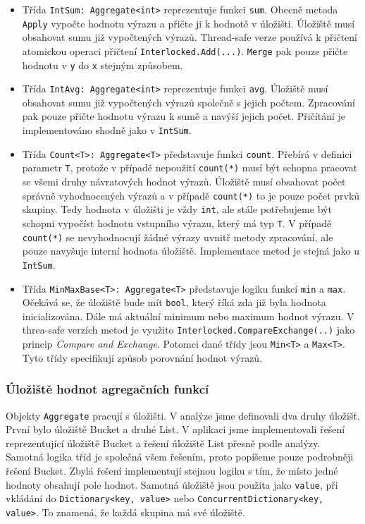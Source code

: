 \begin{itemize}

\item Třída \texttt{IntSum: Aggregate<int>} reprezentuje funkci \texttt{sum}.
Obecně metoda \texttt{Apply} vypočte hodnotu výrazu a přičte ji k hodnotě v úložišti.
Úložiště musí obsahovat sumu již vypočtených výrazů.
Thread-safe verze používá k přičtení atomickou operaci přičtení \texttt{Interlocked.Add(...)}.
\texttt{Merge} pak pouze přičte hodnotu v \texttt{y} do \texttt{x} stejným způsobem.

\item Třída \texttt{IntAvg: Aggregate<int>} reprezentuje funkci \texttt{avg}.
Úložiště musí obsahovat sumu již vypočtených výrazů společně s jejich počtem.
Zpracování pak pouze přičte hodnotu výrazu k sumě a navýší jejich počet.
Přičítání je implementováno shodně jako v \texttt{IntSum}.

\item Třída \texttt{Count<T>: Aggregate<T>} představuje funkci \texttt{count}.
Přebírá v definici parametr \texttt{T}, protože v případě nepoužití \texttt{count(*)} musí být schopna pracovat se všemi druhy návratových hodnot výrazů.
Úložiště musí obsahovat počet správně vyhodnocených výrazů a v případě \texttt{count(*)} to je pouze počet prvků skupiny.
Tedy hodnota v úložišti je vždy \texttt{int}, ale stále potřebujeme být schopni vypočíst hodnotu vstupního výrazu, který má typ \texttt{T}. 
V případě \texttt{count(*)} se nevyhodnocují žádné výrazy uvnitř metody zpracování, ale pouze navyšuje interní hodnota úložiště.
Implementace metod je stejná jako u \texttt{IntSum}.

\item Třída \texttt{MinMaxBase<T>: Aggregate<T>} představuje logiku funkcí \texttt{min} a \texttt{max}.
Očekává se, že úložiště bude mít \texttt{bool}, který říká zda již byla hodnota inicializována.
Dále má aktuální minimum nebo maximum hodnot výrazu. 
V threa-safe verzích metod je využito \texttt{Interlocked.CompareExchange(..)} jako princip \textit{Compare and Exchange}. 
Potomci dané třídy jsou \texttt{Min<T>} a \texttt{Max<T>}.
Tyto třídy specifikují způsob porovnání hodnot výrazů.
\end{itemize}

\subsubsection{Úložiště hodnot agregačních funkcí}

Objekty \texttt{Aggregate} pracují s úložišti.
V analýze jsme definovali dva druhy úložišť.
První bylo úložiště Bucket a druhé List.
V aplikaci jsme implementovali řešení reprezentující úložiště Bucket a řešení úložiště List přesně podle analýzy.
Samotná logika tříd je společná všem řešením, proto popíšeme pouze podrobněji řešení Bucket.
Zbylá řešení implementují stejnou logiku s tím, že místo jedné hodnoty obsahují pole hodnot.
Samotná úložiště jsou použita jako \texttt{value}, při vkládání do \texttt{Dictionary<key, value>} nebo \texttt{ConcurrentDictionary<key, value>}.
To znamená, že každá skupina má své úložiště.

